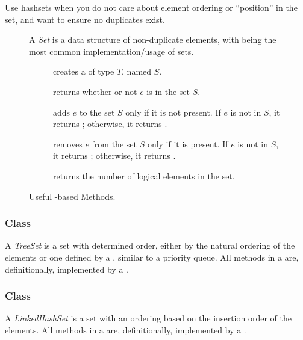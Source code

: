 Use hashsets when you do not care about element ordering or ``position'' in the set, and want to ensure no duplicates exist.
\begin{figure}[tp]
  \small
  \begin{tcolorbox}[title=Java Sets]
    A \emph{Set} is a data structure of non-duplicate elements, with  being the most common implementation/usage of sets.
    \vspace{2ex}
  \begin{description}
    \item [] creates a  of type $T$, named $S$.
     \item [] returns whether or not $e$ is in the set $S$.
     \item [] adds $e$ to the set $S$ only if it is not present. If $e$ is not in $S$, it returns ; otherwise, it returns .
     \item [] removes $e$ from the set $S$ only if it is present. If $e$ is not in $S$, it returns ; otherwise, it returns .
    \item [] returns the number of logical elements in the set.
  \end{description}
\end{tcolorbox}
  \caption{Useful -based Methods.}
  \label{fig:hashsets}
\end{figure}

\subsubsection*{ Class}
A \emph{TreeSet} is a set with determined order, either by the natural ordering of the elements or one defined by a , similar to a priority queue. 
All methods in a  are, definitionally, implemented by a .

\subsubsection*{ Class}
A \emph{LinkedHashSet} is a set with an ordering based on the insertion order of the elements. 
All methods in a  are, definitionally, implemented by a .

